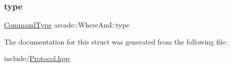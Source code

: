 \mbox{\label{structarcade_1_1_where_am_i_a566284e4a60ce85a0e899da77d13984d}} 
\subsubsection{\texorpdfstring{type}{type}}
{\footnotesize\ttfamily \hyperlink{namespacearcade_a23d58aed7310b22b59e2b8f8ff8a5ffd}{Command\+Type} arcade\+::\+Where\+Am\+I\+::type}



The documentation for this struct was generated from the following file\+:\begin{DoxyCompactItemize}
\item 
include/\hyperlink{include_2_protocol_8hpp}{Protocol.\+hpp}\end{DoxyCompactItemize}
